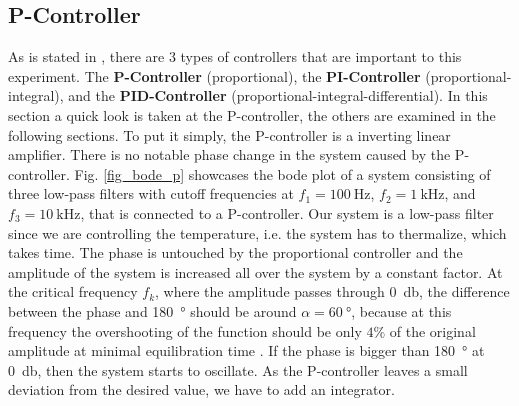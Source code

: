 \documentclass[a4paper,10pt]{article}
\begin{document}
\subsection{P-Controller}
As is stated in \cite{script}, there are 3 types of controllers that are important to this experiment. The \textbf{P-Controller} (proportional), the \textbf{PI-Controller} (proportional-integral), and the \textbf{PID-Controller} (proportional-integral-differential). In this section a quick look is taken at the P-controller, the others are examined in the following sections.
\newline
To put it simply, the P-controller is a inverting linear amplifier. There is no notable phase change in the system caused by the P-controller. Fig. \ref{fig_bode_p} showcases the bode plot of a system consisting of three low-pass filters with cutoff frequencies at $f_1 = \SI{100}{\hertz}$, $f_2 = \SI{1}{\kilo \hertz}$, and $f_3 = \SI{10}{\kilo\hertz}$, that is connected to a P-controller. Our system is a low-pass filter since we are controlling the temperature, i.e. the system has to thermalize, which takes time.
\newline
The phase is untouched by the proportional controller and the amplitude of the system is increased all over the system by a constant factor. At the  critical frequency $f_k$, where the amplitude passes through \SI{0}{\decibel}, the difference between the phase and \SI{180}{\degree} should be around $\alpha = \SI{60}{\degree}$, because at this frequency the overshooting of the function should be only $4\%$ of the original amplitude at minimal equilibration time \cite{halbleiter}. If the phase is bigger than \SI{180}{\degree} at \SI{0}{\decibel}, then the system starts to oscillate. As the P-controller leaves a small deviation from the desired value, we have to add an integrator.
\end{document}
